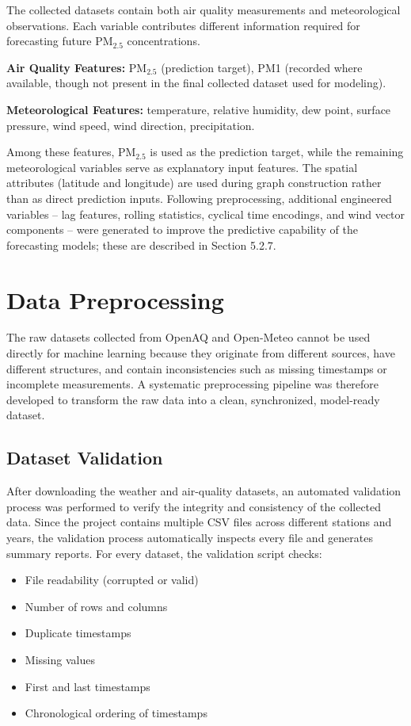 The collected datasets contain both air quality measurements and meteorological
observations. Each variable contributes different information required for
forecasting future PM$_{2.5}$ concentrations.

\textbf{Air Quality Features:} PM$_{2.5}$ (prediction target), PM1 (recorded where
available, though not present in the final collected dataset used for modeling).

\textbf{Meteorological Features:} temperature, relative humidity, dew point, surface
pressure, wind speed, wind direction, precipitation.

Among these features, PM$_{2.5}$ is used as the prediction target, while the remaining
meteorological variables serve as explanatory input features. The spatial attributes
(latitude and longitude) are used during graph construction rather than as direct
prediction inputs. Following preprocessing, additional engineered variables -- lag
features, rolling statistics, cyclical time encodings, and wind vector components --
were generated to improve the predictive capability of the forecasting models; these
are described in Section 5.2.7.

\section{Data Preprocessing}

The raw datasets collected from OpenAQ and Open-Meteo cannot be used directly for
machine learning because they originate from different sources, have different
structures, and contain inconsistencies such as missing timestamps or incomplete
measurements. A systematic preprocessing pipeline was therefore developed to transform
the raw data into a clean, synchronized, model-ready dataset.

\subsection{Dataset Validation}

After downloading the weather and air-quality datasets, an automated validation process
was performed to verify the integrity and consistency of the collected data. Since the
project contains multiple CSV files across different stations and years, the
validation process automatically inspects every file and generates summary reports.
For every dataset, the validation script checks:

\begin{itemize}
    \item File readability (corrupted or valid)
    \item Number of rows and columns
    \item Duplicate timestamps
    \item Missing values
    \item First and last timestamps
    \item Chronological ordering of timestamps
\end{itemize}

